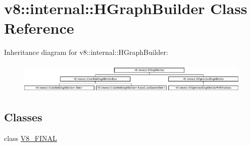 \hypertarget{classv8_1_1internal_1_1_h_graph_builder}{}\section{v8\+:\+:internal\+:\+:H\+Graph\+Builder Class Reference}
\label{classv8_1_1internal_1_1_h_graph_builder}
Inheritance diagram for v8\+:\+:internal\+:\+:H\+Graph\+Builder\+:\begin{figure}[H]
\begin{center}
\leavevmode
\includegraphics[height=1.489362cm]{classv8_1_1internal_1_1_h_graph_builder}
\end{center}
\end{figure}
\subsection*{Classes}
\begin{DoxyCompactItemize}
\item 
class \hyperlink{classv8_1_1internal_1_1_h_graph_builder_1_1_v8___f_i_n_a_l}{V8\+\_\+\+F\+I\+N\+A\+L}
\end{DoxyCompactItemize}
